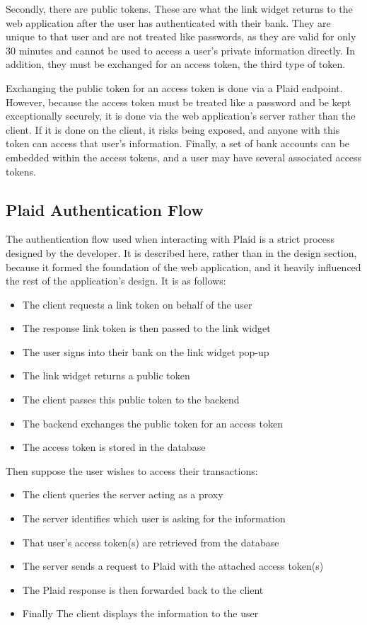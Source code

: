 Secondly, there are public tokens. These are what the link widget returns to the web application after the user has authenticated with their bank. They are unique to that user and are not treated like passwords, as they are valid for only 30 minutes and cannot be used to access a user's private information directly. In addition, they must be exchanged for an access token, the third type of token.

Exchanging the public token for an access token is done via a Plaid endpoint. However, because the access token must be treated like a password and be kept exceptionally securely, it is done via the web application's server rather than the client. If it is done on the client, it risks being exposed, and anyone with this token can access that user's information. Finally, a set of bank accounts can be embedded within the access tokens, and a user may have several associated access tokens.

\subsection{Plaid Authentication Flow}
\label{sec:plaid-authentication-flow}
The authentication flow used when interacting with Plaid is a strict process designed by the developer. It is described here, rather than in the design section, because it formed the foundation of the web application, and it heavily influenced the rest of the application's design. It is as follows:

\begin{itemize}
    \item The client requests a link token on behalf of the user
    \item The response link token is then passed to the link widget
    \item The user signs into their bank on the link widget pop-up
    \item The link widget returns a public token
    \item The client passes this public token to the backend
    \item The backend exchanges the public token for an access token
    \item The access token is stored in the database
\end{itemize}

Then suppose the user wishes to access their transactions:

\begin{itemize}
    \item The client queries the server acting as a proxy
    \item The server identifies which user is asking for the information
    \item That user's access token(s) are retrieved from the database
    \item The server sends a request to Plaid with the attached access token(s)
    \item The Plaid response is then forwarded back to the client
    \item Finally The client displays the information to the user
\end{itemize}

